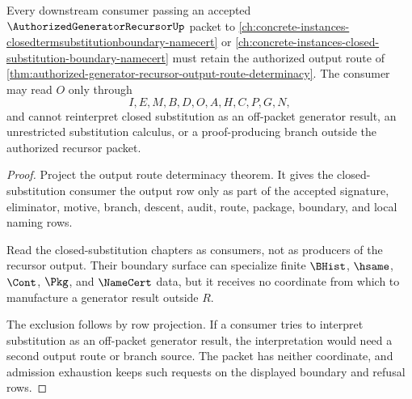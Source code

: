 \begin{theorem}
\label{thm:authorized-generator-recursor-closed-substitution-consumer-lock}
Every downstream consumer passing an accepted $\AuthorizedGeneratorRecursorUp$ packet to \autoref{ch:concrete-instances-closedtermsubstitutionboundary-namecert} or \autoref{ch:concrete-instances-closed-substitution-boundary-namecert} must retain the authorized output route of \autoref{thm:authorized-generator-recursor-output-route-determinacy}. The consumer may read $O$ only through
$$
I,E,M,B,D,O,A,H,C,P,G,N,
$$
and cannot reinterpret closed substitution as an off-packet generator result, an unrestricted substitution calculus, or a proof-producing branch outside the authorized recursor packet.
\end{theorem}
\begin{proof}
Project the output route determinacy theorem. It gives the closed-substitution consumer the output row only as part of the accepted signature, eliminator, motive, branch, descent, audit, route, package, boundary, and local naming rows.

Read the closed-substitution chapters as consumers, not as producers of the recursor output. Their boundary surface can specialize finite $\BHist$, $\hsame$, $\Cont$, $\Pkg$, and $\NameCert$ data, but it receives no coordinate from which to manufacture a generator result outside $R$.

The exclusion follows by row projection. If a consumer tries to interpret substitution as an off-packet generator result, the interpretation would need a second output route or branch source. The packet has neither coordinate, and admission exhaustion keeps such requests on the displayed boundary and refusal rows.
\end{proof}

